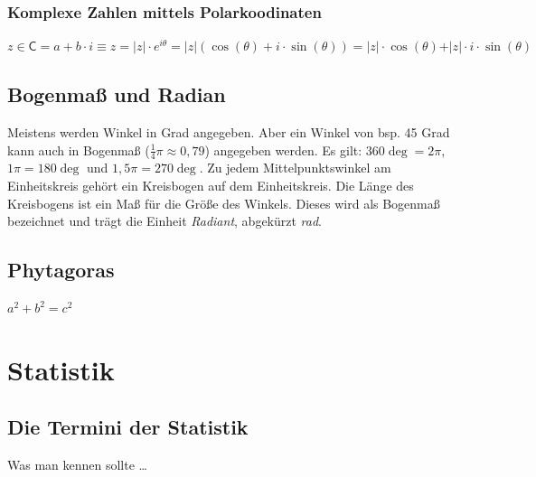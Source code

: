 \documentclass[letterpaper, titlepage]{article}
\begin{document}
\vspace{0.35cm}

\subsubsection{Komplexe Zahlen mittels Polarkoodinaten}
$z \in \mathsf{C} = a + b\cdot i \equiv z = \vert z \vert \cdot e^{i\theta} = \vert z \vert (\cos(\theta) + i \cdot \sin(\theta)) = \vert z \vert \cdot \cos(\theta) + \vert z \vert \cdot i \cdot \sin(\theta)$

\vspace{0.7cm}

\subsection{Bogenmaß und Radian}\label{Bogenmaß und Radian}
Meistens werden Winkel in Grad angegeben. Aber ein Winkel von  bsp. 45 Grad kann auch in Bogenmaß ($\frac{1}{4}\pi \approx 0,79$) angegeben werden. Es gilt: $360\deg = 2\pi$, $1\pi = 180\deg$ und $1,5\pi = 270\deg$. Zu jedem Mittelpunktswinkel am Einheitskreis gehört ein Kreisbogen auf dem Einheitskreis. Die Länge des Kreisbogens ist ein Maß für die Größe des Winkels. Dieses wird als Bogenmaß bezeichnet und trägt die Einheit \textit{Radiant}, abgekürzt \textit{rad}. 
\begin{center}
\end{center}

\vspace{0.7cm}

\subsection{Phytagoras}\label{Phytagoras}
$a^2+b^2=c^2$

\vspace{0.7cm}

\section{Statistik}\label{Statistik}

\vspace{0.35cm}

\subsection{Die Termini der Statistik}\label{Die Termini der Statistik}
Was man kennen sollte \dots
\end{document}
